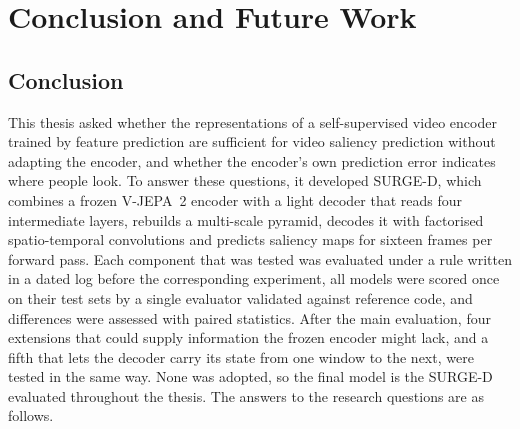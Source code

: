 \chapter{Conclusion and Future Work}\label{ch:conclusion}

\section{Conclusion}\label{sec:conclusion}


This thesis asked whether the representations of a self-supervised video
encoder trained by feature prediction are sufficient for video saliency
prediction without adapting the encoder, and whether the encoder's own
prediction error indicates where people look. To answer these questions, it
developed SURGE-D, which combines a frozen \acrshort{V-JEPA}~2 encoder with a light decoder
that reads four intermediate layers, rebuilds a multi-scale pyramid, decodes it
with factorised spatio-temporal convolutions and predicts saliency maps for
sixteen frames per forward pass. Each component that was tested was evaluated
under a rule written in a dated log before the corresponding experiment, all
models were scored once on their test sets by a single evaluator validated
against reference code, and differences were assessed with paired statistics.
After the main evaluation, four extensions that could supply information the
frozen encoder might lack, and a fifth that lets the decoder carry its state
from one window to the next, were tested in the same way. None was adopted, so
the final model is the SURGE-D evaluated throughout the thesis. The answers to
the research questions are as follows.

